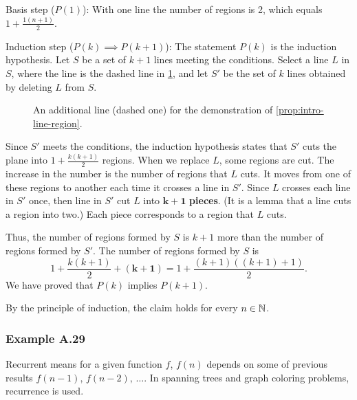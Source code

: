 \documentclass[../src/handouts/main.tex]{subfiles}
\begin{document}
Basis step ($P(1)$): With one line the number of regions is 2, which equals $1 + \frac{1 (n + 1)}{2}$.

Induction step ($P(k) \implies P(k + 1)$): The statement $P(k)$ is the induction hypothesis. Let $S$ be a set of $k + 1$ lines meeting the conditions. Select a line $L$ in $S$, where the line is the dashed line in \cref{fig:intro-line-region-additional}, and let $S'$ be the set of $k$ lines obtained by deleting $L$ from $S$.

\begin{figure}[htbp]
  \centering
  \caption{An additional line (dashed one) for the demonstration of \cref{prop:intro-line-region}.}
  \label{fig:intro-line-region-additional}
\end{figure}

Since $S'$ meets the conditions, the induction hypothesis states that $S'$ cuts the plane into $1 + \frac{k (k + 1)}{2}$ regions.
When we replace $L$, some regions are cut.
The increase in the number is the number of regions that $L$ cuts. It moves from one of these regions to another each time it crosses a line in $S'$.
Since $L$ crosses each line in $S'$ once, then line in $S'$ cut $L$ into $\bm{k + 1}$ \textbf{pieces}. (It is a lemma that a line cuts a region into two.)
Each piece corresponds to a region that $L$ cuts.

Thus, the number of regions formed by $S$ is $k + 1$ more than the number of regions formed by $S'$.
The number of regions formed by $S$ is
$$
  1 + \frac{k (k + 1)}{2} + \bm{(k + 1)} = 1 + \frac{(k + 1)((k + 1) + 1)}{2}.
$$
We have proved that $P(k)$ implies $P(k + 1)$.

By the principle of induction, the claim holds for every $n \in \mathbb{N}$.


\subsubsection{Example A.29}

Recurrent means for a given function $f$, $f(n)$ depends on some of previous results $f(n - 1),\, f(n - 2),\, \ldots$. In spanning trees and graph coloring problems, recurrence is used.
\end{document}
